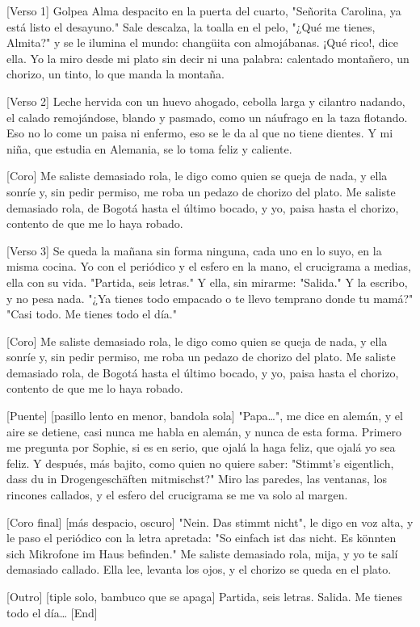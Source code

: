 \begin{lyrics}

[Verso 1]
Golpea Alma despacito en la puerta del cuarto,
"Señorita Carolina, ya está listo el desayuno."
Sale descalza, la toalla en el pelo,
"¿Qué me tienes, Almita?" y se le ilumina el mundo:
changüita con almojábanas. ¡Qué rico!, dice ella.
Yo la miro desde mi plato sin decir ni una palabra:
calentado montañero, un chorizo, un tinto,
lo que manda la montaña.

[Verso 2]
Leche hervida con un huevo ahogado,
cebolla larga y cilantro nadando,
el calado remojándose, blando y pasmado,
como un náufrago en la taza flotando.
Eso no lo come un paisa ni enfermo,
eso se le da al que no tiene dientes.
Y mi niña, que estudia en Alemania,
se lo toma feliz y caliente.

[Coro]
Me saliste demasiado rola,
le digo como quien se queja de nada,
y ella sonríe y, sin pedir permiso,
me roba un pedazo de chorizo del plato.
Me saliste demasiado rola,
de Bogotá hasta el último bocado,
y yo, paisa hasta el chorizo,
contento de que me lo haya robado.

[Verso 3]
Se queda la mañana sin forma ninguna,
cada uno en lo suyo, en la misma cocina.
Yo con el periódico y el esfero en la mano,
el crucigrama a medias, ella con su vida.
"Partida, seis letras." Y ella, sin mirarme:
"Salida." Y la escribo, y no pesa nada.
"¿Ya tienes todo empacado o te llevo temprano
donde tu mamá?" "Casi todo. Me tienes todo el día."

[Coro]
Me saliste demasiado rola,
le digo como quien se queja de nada,
y ella sonríe y, sin pedir permiso,
me roba un pedazo de chorizo del plato.
Me saliste demasiado rola,
de Bogotá hasta el último bocado,
y yo, paisa hasta el chorizo,
contento de que me lo haya robado.

[Puente]
[pasillo lento en menor, bandola sola]
"Papa…", me dice en alemán, y el aire se detiene,
casi nunca me habla en alemán, y nunca de esta forma.
Primero me pregunta por Sophie, si es en serio,
que ojalá la haga feliz, que ojalá yo sea feliz.
Y después, más bajito, como quien no quiere saber:
"Stimmt's eigentlich, dass du in Drogengeschäften mitmischst?"
Miro las paredes, las ventanas, los rincones callados,
y el esfero del crucigrama se me va solo al margen.

[Coro final]
[más despacio, oscuro]
"Nein. Das stimmt nicht", le digo en voz alta,
y le paso el periódico con la letra apretada:
"So einfach ist das nicht.
Es könnten sich Mikrofone im Haus befinden."
Me saliste demasiado rola, mija,
y yo te salí demasiado callado.
Ella lee, levanta los ojos,
y el chorizo se queda en el plato.

[Outro]
[tiple solo, bambuco que se apaga]
Partida, seis letras.
Salida.
Me tienes todo el día…
[End]
\end{lyrics}

